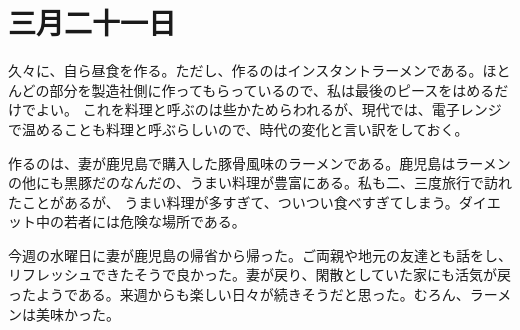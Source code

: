 \chapter{三月二十一日}

久々に、自ら昼食を作る。ただし、作るのはインスタントラーメンである。ほとんどの部分を製造社側に作ってもらっているので、私は最後のピースをはめるだけでよい。
これを料理と呼ぶのは些かためらわれるが、現代では、電子レンジで温めることも料理と呼ぶらしいので、時代の変化と言い訳をしておく。

作るのは、妻が鹿児島で購入した豚骨風味のラーメンである。鹿児島はラーメンの他にも黒豚だのなんだの、うまい料理が豊富にある。私も二、三度旅行で訪れたことがあるが、
うまい料理が多すぎて、ついつい食べすぎてしまう。ダイエット中の若者には危険な場所である。

今週の水曜日に妻が鹿児島の帰省から帰った。ご両親や地元の友達とも話をし、リフレッシュできたそうで良かった。妻が戻り、閑散としていた家にも活気が戻ったようである。来週からも楽しい日々が続きそうだと思った。むろん、ラーメンは美味かった。

